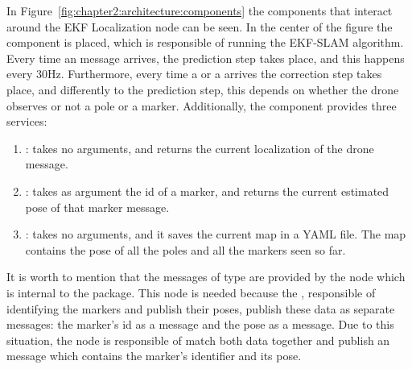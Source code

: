 In Figure~\ref{fig:chapter2:architecture:components} the components that interact around the \ac{EKF} Localization node can be seen. In the center of the figure the  component is placed, which is responsible of running the EKF-SLAM algorithm. Every time an  message arrives, the prediction step takes place, and this happens every 30Hz. Furthermore, every time a  or a  arrives the correction step takes place, and differently to the prediction step, this depends on whether the drone observes or not a pole or a marker. Additionally, the  component provides three services:
\begin{enumerate}
    \item {}: takes no arguments, and returns the current localization of the drone  message.
    \item {}: takes as argument the id of a marker, and returns the current estimated pose of that marker message.
    \item {}: takes no arguments, and it saves the current map in a YAML file. The map contains the pose of all the poles and all the markers seen so far.
\end{enumerate}

It is worth to mention that the messages of type  are provided by the  node which is internal to the  package. This node is needed because the , responsible of identifying the markers and publish their poses, publish these data as separate messages: the marker's id as a  message and the pose as a  message. Due to this situation, the  node is responsible of match both data together and publish an  message which contains the marker's identifier and its pose.\\

